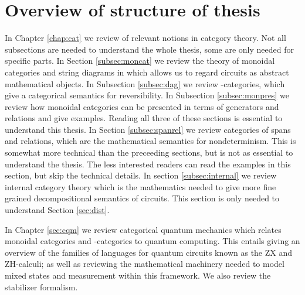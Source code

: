 \section{Overview of structure of thesis}
In Chapter \ref{chap:cat} we review of relevant notions in category theory. Not all subsections are needed to understand the whole thesis, some are only needed for specific parts.  In Section \ref{subsec:moncat} we review the theory of monoidal categories and string diagrams in which allows us to regard circuits as abstract mathematical objects.  In Subsection \ref{subsec:dag} we review \dag-categories, which give a categorical semantics for reversibility. In Subsection \ref{subsec:monpres} we review how monoidal categories can be presented in terms of generators and relations and give examples.  Reading all three of these sections is essential to understand this thesis.
In Section \ref{subsec:spanrel} we review categories of spans and relations, which are the mathematical semantics for  nondeterminism.  This is somewhat more technical than the preceeding sections, but is not as essential to understand the thesis.  The less interested readers can read the examples in this section, but skip the technical details.  In section \ref{subsec:internal} we review internal category theory which is the mathematics needed to give more fine grained decompositional semantics of circuits.    This section is only needed to understand Section \ref{sec:dist}.

In Chapter \ref{sec:cqm} we review  categorical quantum mechanics which relates monoidal categories and \dag-categories to quantum computing. This entails giving an overview of the families of languages for quantum circuits known as the  ZX and ZH-calculi; as well as reviewing the mathematical machinery needed to model mixed states and measurement within this framework.  We also review the stabilizer formalism.

